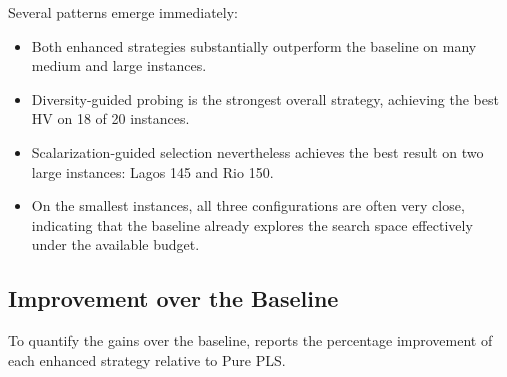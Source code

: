 \documentclass[11pt,a4paper]{article}
\begin{document}
Several patterns emerge immediately:
\begin{itemize}
  \item Both enhanced strategies substantially outperform the baseline on
    many medium and large instances.
  \item Diversity-guided probing is the strongest overall strategy,
    achieving the best HV on 18 of 20 instances.
  \item Scalarization-guided selection nevertheless achieves the best
    result on two large instances: Lagos 145 and Rio 150.
  \item On the smallest instances, all three configurations are often
    very close, indicating that the baseline already explores the search
    space effectively under the available budget.
\end{itemize}

\subsection{Improvement over the Baseline}

To quantify the gains over the baseline,  reports
the percentage improvement of each enhanced strategy relative to Pure
PLS.
\end{document}
